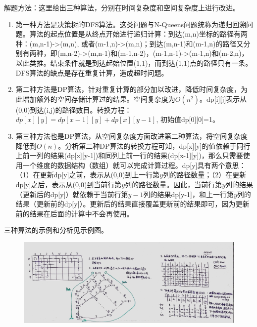 \documentclass[a4paper,10pt]{article}
\begin{document}
\begin{CJK*}{UTF8}{gbsn}
\noindent 解题方法：这里给出三种算法，分别在时间复杂度和空间复杂度上进行改进。
\begin{enumerate}
    \item 第一种方法是决策树的DFS算法。这类问题与N-Queens问题统称为递归回溯问题。算法的起点位置是从终点开始进行递归计算：到达(m,n)坐标的路径有两种：(m,n-1)->(m,n), 或者(m-1,n)->(m,n)；到达(m,n-1)和(m-1,n)的路径又分别有两种，即(m,n-2)->(m,n-1)和(m-1,n-2)，(m-1,n-1)->(m-1,n)和(m-2,n)，以此类推。结束条件就是到达起始位置(1,1)，而到达(1,1)点的路径只有一条。DFS算法的缺点是存在重复计算，造成超时问题。
    
    \item 第二种方法是DP算法，针对重复计算的部分加以改进，降低时间复杂度，为此增加额外的空间存储计算过的结果。空间复杂度为$O(n^2)$。dp[i][j]表示从(0,0)到达(i,j)的路径数目。转换方程：$dp[x][y] = dp[x-1][y] + dp[x][y-1]$, 初始值dp[0][0]=1。
    
    \item 第三种方法也是DP算法，从空间复杂度方面改进第二种算法，将空间复杂度降低到$O(n)$。分析第二种DP算法的转换方程可知，dp[x][y]的值依赖于同行上前一列的结果(dp[x][y-1])和同列上前一行的结果(dp[x-1][y])，那么只需要使用一个维度的数据结构（数组）就可以完成计算过程。dp[y]具有两个意思：（1）在更新dp[y]之前，表示从(0,0)到上一行第$y$列的路径数量；（2）在更新dp[y]之后，表示从(0,0)到当前行第$y$列的路径数量。因此，当前行第$y$列的结果（更新后的dp[y]）就依赖于当前行第$y-1$列的结果dp[y-1]，和上一行第$y$列的结果（更新前的dp[y]）。更新后的结果直接覆盖更新前的结果即可，因为更新前的结果在后面的计算中不会再使用。
\end{enumerate}
\noindent 三种算法的示例和分析见示例图。
\end{CJK*}

\begin{figure}[h]
    \includegraphics[width=1\textwidth]{leetcode62.jpg}
    \centering\\
\end{figure}
\end{document}

